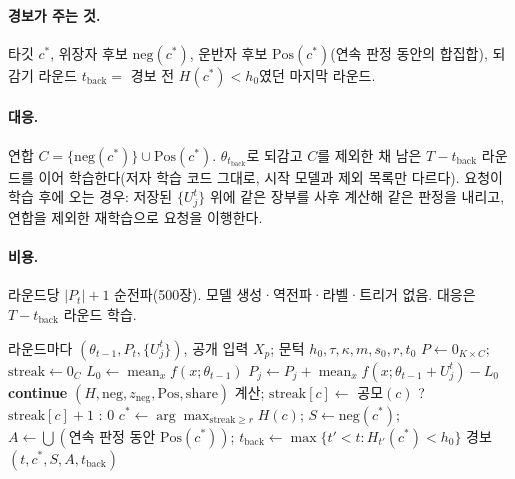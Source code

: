 \documentclass[10pt,a4paper]{article}
\begin{document}
\paragraph{경보가 주는 것.} 타깃 $c^*$, 위장자 후보 $\mathrm{neg}(c^*)$, 운반자 후보 $\mathrm{Pos}(c^*)$(연속 판정 동안의 합집합), 되감기 라운드 $t_{\mathrm{back}}=$ 경보 전 $H(c^*)<h_0$였던 마지막 라운드.
\paragraph{대응.}\label{sec:response} 연합 $C=\{\mathrm{neg}(c^*)\}\cup\mathrm{Pos}(c^*)$. $\theta_{t_{\mathrm{back}}}$로 되감고 $C$를 제외한 채 남은 $T-t_{\mathrm{back}}$ 라운드를 이어 학습한다(저자 학습 코드 그대로, 시작 모델과 제외 목록만 다르다). 요청이 학습 후에 오는 경우: 저장된 $\{U_j^t\}$ 위에 같은 장부를 사후 계산해 같은 판정을 내리고, 연합을 제외한 재학습으로 요청을 이행한다.
\paragraph{비용.} 라운드당 $|P_t|+1$ 순전파(500장). 모델 생성·역전파·라벨·트리거 없음. 대응은 $T-t_{\mathrm{back}}$ 라운드 학습.

\begin{algorithm}[t]
\caption{균형 장부}
\begin{algorithmic}[1]
\Require 라운드마다 $(\theta_{t-1},P_t,\{U_j^t\})$, 공개 입력 $X_p$; 문턱 $h_0,\tau,\kappa,m,s_0,r,t_0$
\State $P\gets 0_{K\times C}$; $\mathrm{streak}\gets 0_C$
  \State $L_0\gets\operatorname{mean}_x f(x;\theta_{t-1})$
   $P_j\gets P_j+\operatorname{mean}_x f(x;\theta_{t-1}+U_j^t)-L_0$ \EndFor
   \textbf{continue} \EndIf
   $(H,\mathrm{neg},z_{\mathrm{neg}},\mathrm{Pos},\mathrm{share})$ 계산; $\mathrm{streak}[c]\gets$ 공모$(c)$ ? $\mathrm{streak}[c]+1$ : 0 \EndFor
     \State $c^*\gets\arg\max_{\mathrm{streak}\ge r}H(c)$; $S\gets\mathrm{neg}(c^*)$; $A\gets\bigcup(\text{연속 판정 동안 }\mathrm{Pos}(c^*))$; $t_{\mathrm{back}}\gets\max\{t'<t: H_{t'}(c^*)<h_0\}$
     \State \Return 경보$(t,c^*,S,A,t_{\mathrm{back}})$ 
  \EndIf
\EndFor
\end{algorithmic}
\end{algorithm}
\end{document}
